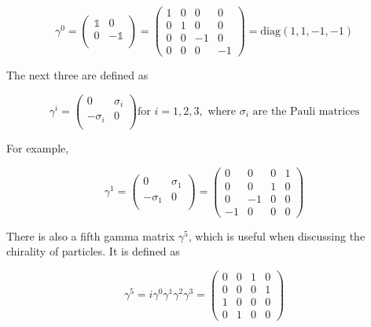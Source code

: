\begin{easylist}[itemize]
\Deactivate %

\begin{equation}
\gamma^0 =
\begin{pmatrix}
\mathbb{1} & 0 \\
0 & \mathbb{-1} \\
\end{pmatrix}
=
\begin{pmatrix}
1 & 0 & 0 & 0 \\
0 & 1 & 0 & 0 \\
0 & 0 & -1 & 0 \\
0 & 0 & 0 & -1
\end{pmatrix}
= \mathrm{diag}(1, 1, -1, -1)
\end{equation}

The next three are defined as

\begin{equation}
\gamma^i =
\begin{pmatrix}
0 & \sigma_i \\
-\sigma_i & 0 \\
\end{pmatrix}
\textrm{for $i = 1, 2, 3,$ where $\sigma_i$ are the Pauli matrices}
\end{equation}

For example,

\begin{equation}
\gamma^1 =
\begin{pmatrix}
0 & \sigma_1 \\
-\sigma_1 & 0 \\
\end{pmatrix}
=
\begin{pmatrix}
0 & 0 & 0 & 1 \\
0 & 0 & 1 & 0 \\
0 & -1 & 0 & 0 \\
-1 & 0 & 0 & 0
\end{pmatrix}
\end{equation}

There is also a fifth gamma matrix $\gamma^5$, which is useful when discussing the chirality of particles. It is defined as

\begin{equation}
\gamma^5 = i \gamma^0 \gamma^1 \gamma^2 \gamma^3 =
\begin{pmatrix}
0 & 0 & 1 & 0 \\
0 & 0 & 0 & 1 \\
1 & 0 & 0 & 0 \\
0 & 1 & 0 & 0
\end{pmatrix}
\end{equation}


\end{easylist}

